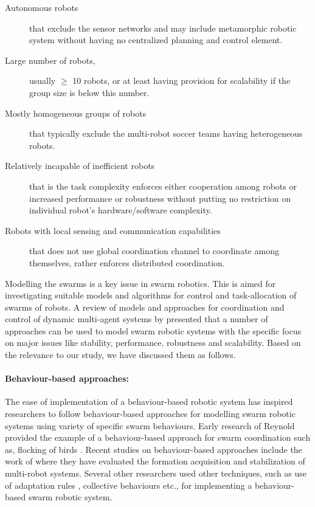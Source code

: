 \begin{description}
\item[Autonomous robots]
that exclude the sensor networks and may include metamorphic robotic system without having no centralized planning and control element.
\item[Large number of robots,]
usually $\geq$ 10 robots, or at least having provision for scalability if the group size is below this number.
\item[Mostly homogeneous groups of robots]
that typically exclude the multi-robot soccer teams having heterogeneous robots.
\item[Relatively incapable of inefficient robots]
that is the task complexity enforces either cooperation among robots or increased performance or robustness without putting no restriction on individual robot's hardware/software complexity.
\item[Robots with local sensing and communication capabilities]
that does not use global coordination channel to coordinate among themselves, rather enforces distributed coordination.
\end{description}
Modelling the swarms is a key issue in swarm robotics. This is aimed for investigating suitable models and algorithms for control and task-allocation of swarms of robots. A review of models and approaches for coordination and control of dynamic multi-agent systems by \cite{Gazi+2006} presented that a number of approaches can be used to model swarm robotic systems with the specific focus on major issues like stability, performance, robustness and scalability. Based on the relevance to our study, we have discussed them as follows.
\paragraph*{Behaviour-based approaches:}
The ease of implementation of a behaviour-based robotic system has inspired researchers to follow behaviour-based approaches for modelling swarm robotic systems using variety of specific swarm behaviours. Early research of Reynold provided the example of a behaviour-based approach for swarm coordination such as, flocking of birds \cite{Reynolds1987}. Recent studies on behaviour-based approaches include the work of \cite{Balch+1998} where they have evaluated the formation acquisition and stabilization of multi-robot systems. Several other researchers used other techniques, such as use of adaptation rules \cite{Liu+2007}, collective behaviours \cite{Cianci2007} etc., for implementing a behaviour-based swarm robotic system.

